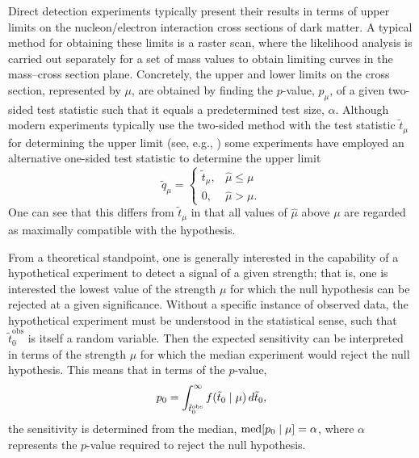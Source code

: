 Direct detection experiments typically present their results in terms of upper limits on the nucleon/electron interaction cross sections of dark matter. A typical method for obtaining these limits is a raster scan, where the likelihood analysis is carried out separately for a set of mass values to obtain limiting curves in the mass--cross section plane. Concretely, the upper and lower limits on the cross section, represented by $\mu$, are obtained by finding the $p$-value, $p_\mu$, of a given two-sided test statistic such that it equals a predetermined test size, $\alpha$. Although modern experiments typically use the two-sided method with the test statistic $\tilde{t}_\mu$ for determining the upper limit (see, e.g., \textcites{XENON2019b, PandaX2021, LZ2024}) some experiments have employed an alternative one-sided test statistic to determine the upper limit \parencite{CowanEtAl2011}
\begin{equation}
    \tilde{q}_\mu=
    \begin{cases}
        \tilde{t}_\mu,&\hat{\mu}\leq\mu\\
        0,&\hat{\mu}>\mu.
    \end{cases}
\end{equation}
One can see that this differs from $\tilde{t}_\mu$ in that all values of $\hat{\mu}$ above $\mu$ are regarded as maximally compatible with the hypothesis.

From a theoretical standpoint, one is generally interested in the capability of a hypothetical experiment to detect a signal of a given strength; that is, one is interested the lowest value of the strength $\mu$ for which the null hypothesis can be rejected at a given significance. Without a specific instance of observed data, the hypothetical experiment must be understood in the statistical sense, such that $\tilde{t}_0^\text{obs}$ is itself a random variable. Then the expected sensitivity can be interpreted in terms of the strength $\mu$ for which the median experiment would reject the null hypothesis. This means that in terms of the $p$-value,
\begin{equation}
    p_0=\int_{\tilde{t}_0^\text{obs}}^\infty f(\tilde{t}_0\mid\mu)\,d\tilde{t}_0,
\end{equation}
the sensitivity is determined from the median, $\operatorname{med}[p_0\mid\mu]=\alpha$, where $\alpha$ represents the $p$-value required to reject the null hypothesis.

